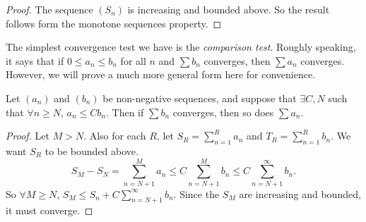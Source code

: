 \documentclass[a4paper]{article}
\begin{document}
\begin{proof}
  The sequence $(S_n)$ is increasing and bounded above. So the result follows form the monotone sequences property.
\end{proof}

The simplest convergence test we have is the \emph{comparison test}. Roughly speaking, it says that if $0 \leq a_n \leq b_n$ for all $n$ and $\sum b_n$ converges, then $\sum a_n$ converges. However, we will prove a much more general form here for convenience.
\begin{lemma}
  Let $(a_n)$ and $(b_n)$ be non-negative sequences, and suppose that $\exists C, N$ such that $\forall n\geq N$, $a_n \leq Cb_n$. Then if $\sum b_n$ converges, then so does $\sum a_n$.
\end{lemma}

\begin{proof}
  Let $M > N$. Also for each $R$, let $S_R = \sum_{n = 1}^R a_n$ and $T_R = \sum_{n = 1}^R b_n$. We want $S_R$ to be bounded above.
  \[
    S_M - S_N = \sum_{n = N + 1}^M a_n \leq C\sum _{n = N + 1}^M b_n \leq C\sum_{n = N + 1}^\infty b_n.
  \]
  So $\forall M\geq N$, $S_M \leq S_n + C\sum_{n = N + 1}^\infty b_n$. Since the $S_M$ are increasing and bounded, it must converge.
\end{proof}
\end{document}
